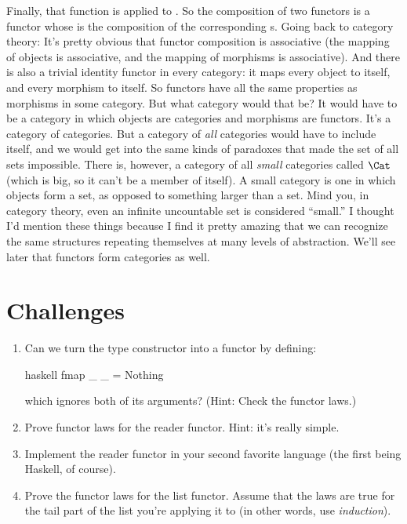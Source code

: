 Finally, that function is applied to . So the composition of
two functors is a functor whose  is the composition of the
corresponding s. Going back to category theory: It's pretty
obvious that functor composition is associative (the mapping of objects
is associative, and the mapping of morphisms is associative). And there
is also a trivial identity functor in every category: it maps every
object to itself, and every morphism to itself. So functors have all the
same properties as morphisms in some category. But what category would
that be? It would have to be a category in which objects are categories
and morphisms are functors. It's a category of categories. But a
category of \emph{all} categories would have to include itself, and we
would get into the same kinds of paradoxes that made the set of all sets
impossible. There is, however, a category of all \emph{small} categories
called $\Cat$ (which is big, so it can't be a member of itself). A
small category is one in which objects form a set, as opposed to
something larger than a set. Mind you, in category theory, even an
infinite uncountable set is considered ``small.'' I thought I'd mention
these things because I find it pretty amazing that we can recognize the
same structures repeating themselves at many levels of abstraction.
We'll see later that functors form categories as well.

\section{Challenges}

\begin{enumerate}
  \tightlist
  \item
        Can we turn the  type constructor into a functor by
        defining:

        \begin{snip}{haskell}
fmap _ _ = Nothing
\end{snip}

        which ignores both of its arguments? (Hint: Check the functor laws.)
  \item
        Prove functor laws for the reader functor. Hint: it's really simple.
  \item
        Implement the reader functor in your second favorite language (the
        first being Haskell, of course).
  \item
        Prove the functor laws for the list functor. Assume that the laws are
        true for the tail part of the list you're applying it to (in other
        words, use \emph{induction}).
\end{enumerate}
